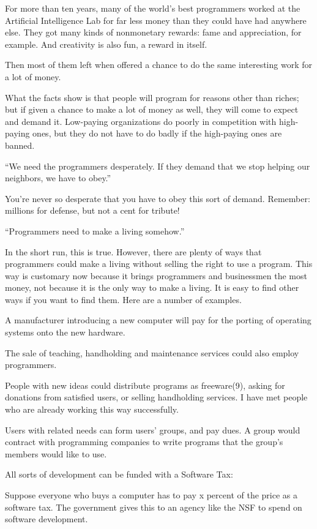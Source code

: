 For more than ten years, many of the world's best programmers worked at the Artificial Intelligence Lab for far less money than they could have had anywhere else. They got many kinds of nonmonetary rewards: fame and appreciation, for example. And creativity is also fun, a reward in itself.

Then most of them left when offered a chance to do the same interesting work for a lot of money.

What the facts show is that people will program for reasons other than riches; but if given a chance to make a lot of money as well, they will come to expect and demand it. Low-paying organizations do poorly in competition with high-paying ones, but they do not have to do badly if the high-paying ones are banned.

“We need the programmers desperately. If they demand that we stop helping our neighbors, we have to obey.”

You're never so desperate that you have to obey this sort of demand. Remember: millions for defense, but not a cent for tribute!

“Programmers need to make a living somehow.”

In the short run, this is true. However, there are plenty of ways that programmers could make a living without selling the right to use a program. This way is customary now because it brings programmers and businessmen the most money, not because it is the only way to make a living. It is easy to find other ways if you want to find them. Here are a number of examples.

A manufacturer introducing a new computer will pay for the porting of operating systems onto the new hardware.

The sale of teaching, handholding and maintenance services could also employ programmers.

People with new ideas could distribute programs as freeware(9), asking for donations from satisfied users, or selling handholding services. I have met people who are already working this way successfully.

Users with related needs can form users' groups, and pay dues. A group would contract with programming companies to write programs that the group's members would like to use.

All sorts of development can be funded with a Software Tax:

Suppose everyone who buys a computer has to pay x percent of the price as a software tax. The government gives this to an agency like the NSF to spend on software development.

